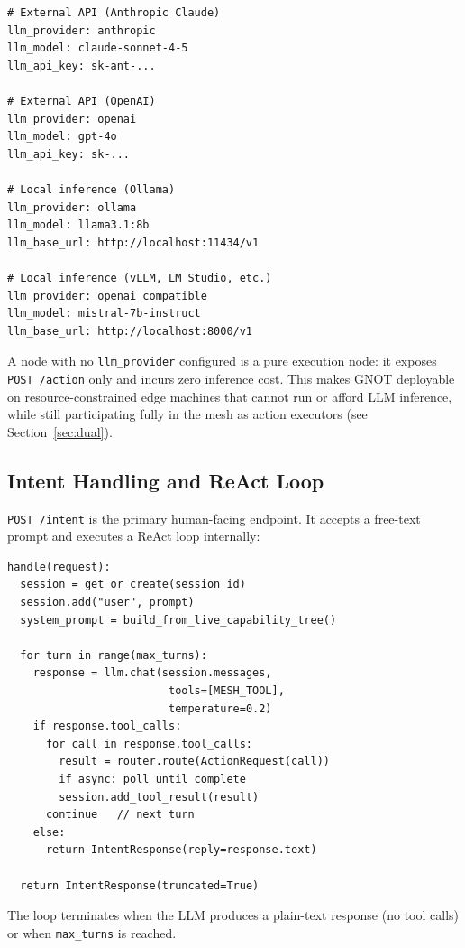 \documentclass[10pt,twocolumn]{article}
\begin{document}
\begin{lstlisting}[caption={LLM provider configuration examples}]
# External API (Anthropic Claude)
llm_provider: anthropic
llm_model: claude-sonnet-4-5
llm_api_key: sk-ant-...

# External API (OpenAI)
llm_provider: openai
llm_model: gpt-4o
llm_api_key: sk-...

# Local inference (Ollama)
llm_provider: ollama
llm_model: llama3.1:8b
llm_base_url: http://localhost:11434/v1

# Local inference (vLLM, LM Studio, etc.)
llm_provider: openai_compatible
llm_model: mistral-7b-instruct
llm_base_url: http://localhost:8000/v1
\end{lstlisting}

A node with no \texttt{llm\_provider} configured is a pure execution
node: it exposes \texttt{POST /action} only and incurs zero inference
cost. This makes GNOT deployable on resource-constrained edge machines
that cannot run or afford LLM inference, while still participating
fully in the mesh as action executors (see Section~\ref{sec:dual}).

\subsection{Intent Handling and ReAct Loop}

\texttt{POST /intent} is the primary human-facing endpoint. It accepts a
free-text prompt and executes a ReAct loop internally:

\begin{lstlisting}[caption={ReAct loop pseudocode}]
handle(request):
  session = get_or_create(session_id)
  session.add("user", prompt)
  system_prompt = build_from_live_capability_tree()

  for turn in range(max_turns):
    response = llm.chat(session.messages,
                         tools=[MESH_TOOL],
                         temperature=0.2)
    if response.tool_calls:
      for call in response.tool_calls:
        result = router.route(ActionRequest(call))
        if async: poll until complete
        session.add_tool_result(result)
      continue   // next turn
    else:
      return IntentResponse(reply=response.text)

  return IntentResponse(truncated=True)
\end{lstlisting}

The loop terminates when the LLM produces a plain-text response (no tool
calls) or when \texttt{max\_turns} is reached.
\end{document}
